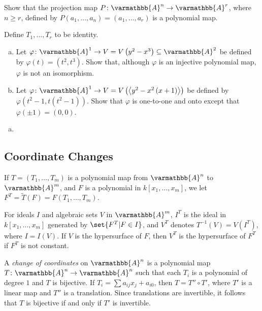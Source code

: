 \documentclass[10pt]{mypackage}
\renewcommand*{\mathbb}[1]{\varmathbb{#1}}
\newcommand{\A}{\mathbb{A}}
\begin{document}
\begin{exercise}[Exercise 2.10]
  Show that the projection map $P\colon \A^n\rightarrow \A^r$, where $n\geq r$, defined by $P\left( a_1,\dots,a_n \right) = \left( a_1,\dots,a_r \right)$ is a polynomial map.
\end{exercise}
\begin{solution}
  Define $T_1,\dots,T_r$ to be identity.
\end{solution}
\begin{exercise}[Exercise 2.12]\hfill
  \begin{enumerate}[(a)]
    \item Let $\varphi\colon \A^1\rightarrow V = V\left( y^2-x^3 \right)\subseteq \A^2$ be defined by $\varphi\left( t \right) = \left( t^2,t^3 \right)$. Show that, although $\varphi$ is an injective polynomial map, $\varphi$ is not an isomorphism.
    \item Let $\varphi\colon \A^1\rightarrow V = V\left( \left\langle y^2-x^2\left( x+1 \right) \right\rangle \right)$ be defined by $\varphi\left( t^2-1,t\left( t^2-1 \right) \right)$. Show that $\varphi$ is one-to-one and onto except that $\varphi\left( \pm 1 \right) = (0,0)$.
  \end{enumerate}
\end{exercise}
\begin{solution}\hfill
  \begin{enumerate}[(a)]
    \item 
  \end{enumerate}
\end{solution}

\subsection{Coordinate Changes}%
If $T = \left( T_1,\dots,T_m \right)$ is a polynomial map from $\A^n$ to $\A^m$, and $F$ is a polynomial in $k\left[ x_1,\dots,x_m \right]$, we let $F^T = \widetilde{T}\left( F \right) = F\left( T_1,\dots,T_m \right)$.\newline

For ideals $I$ and algebraic sets $V$ in $\A^m$, $I^T$ is the ideal in $k\left[ x_1,\dots,x_m \right]$ generated by $\set{F^T | F\in I}$, and $V^T$ denotes $T^{-1}\left( V \right) = V\left( I^T \right)$, where $I = I(V)$. If $V$ is the hypersurface of $F$, then $V^T$ is the hypersurface of $F^T$ if $F^T$ is not constant.\newline

A \textit{change of coordinates} on $\A^n$ is a polynomial map $T\colon \A^n\rightarrow \A^n$ such that each $T_i$ is a polynomial of degree $1$ and $T$ is bijective. If $T_i = \sum a_{ij}x_j + a_{i0}$, then $T = T'' \circ T'$, where $T'$ is a linear map and $T''$ is a translation. Since translations are invertible, it follows that $T$ is bijective if and only if $T'$ is invertible.\newline
\end{document}
